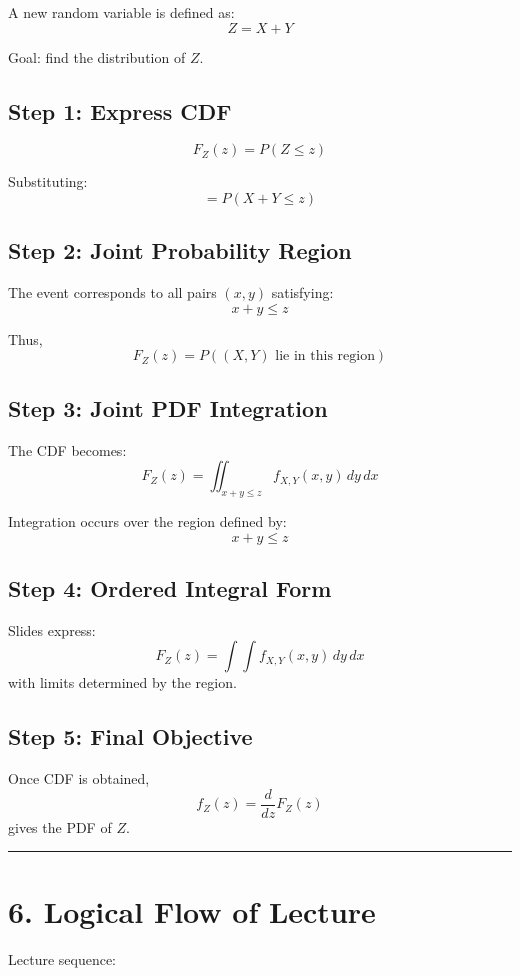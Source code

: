 \documentclass[11pt]{article}
\begin{document}
A new random variable is defined as:
\[
Z = X + Y
\]

Goal: find the distribution of \(Z\).

\subsection*{Step 1: Express CDF}

\[
F_Z(z) = P(Z \le z)
\]

Substituting:
\[
= P(X + Y \le z)
\]

\subsection*{Step 2: Joint Probability Region}

The event corresponds to all pairs \((x, y)\) satisfying:
\[
x + y \le z
\]

Thus,
\[
F_Z(z) = P((X, Y) \text{ lie in this region})
\]

\subsection*{Step 3: Joint PDF Integration}

The CDF becomes:
\[
F_Z(z)
= \iint_{x + y \le z} f_{X,Y}(x,y)\, dy\, dx
\]

Integration occurs over the region defined by:
\[
x + y \le z
\]

\subsection*{Step 4: Ordered Integral Form}

Slides express:
\[
F_Z(z)
= \int \int f_{X,Y}(x,y)\, dy\, dx
\]
with limits determined by the region.

\subsection*{Step 5: Final Objective}

Once CDF is obtained,
\[
f_Z(z) = \frac{d}{dz}F_Z(z)
\]
gives the PDF of \(Z\).

\hrule
\vspace{0.5em}

\section*{6. Logical Flow of Lecture}

Lecture sequence:
\end{document}
